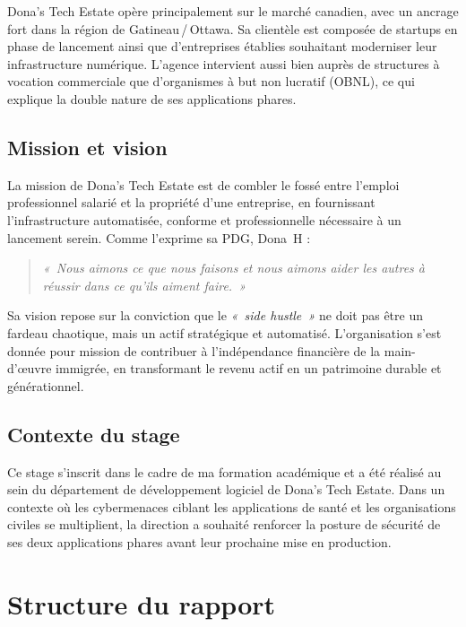 Dona's Tech Estate opère principalement sur le marché canadien, avec un ancrage fort dans
la région de Gatineau\,/\,Ottawa. Sa clientèle est composée de startups en phase de
lancement ainsi que d'entreprises établies souhaitant moderniser leur infrastructure
numérique. L'agence intervient aussi bien auprès de structures à vocation commerciale que
d'organismes à but non lucratif (OBNL), ce qui explique la double nature de ses applications
phares.

\subsection{Mission et vision}

La mission de Dona's Tech Estate est de combler le fossé entre l'emploi professionnel
salarié et la propriété d'une entreprise, en fournissant l'infrastructure automatisée,
conforme et professionnelle nécessaire à un lancement serein. Comme l'exprime sa PDG,
Dona~H :

\begin{quote}
  \itshape
  «~Nous aimons ce que nous faisons et nous aimons aider les autres à réussir dans ce
  qu'ils aiment faire.~»
\end{quote}

Sa vision repose sur la conviction que le \textit{«~side hustle~»} ne doit pas être un
fardeau chaotique, mais un actif stratégique et automatisé. L'organisation s'est donnée
pour mission de contribuer à l'indépendance financière de la main-d'œuvre immigrée, en
transformant le revenu actif en un patrimoine durable et générationnel.

\subsection{Contexte du stage}

Ce stage s'inscrit dans le cadre de ma formation académique et a été réalisé au sein du
département de développement logiciel de Dona's Tech Estate. Dans un contexte où les
cybermenaces ciblant les applications de santé et les organisations civiles se multiplient,
la direction a souhaité renforcer la posture de sécurité de ses deux applications phares
avant leur prochaine mise en production.

\section{Structure du rapport}

